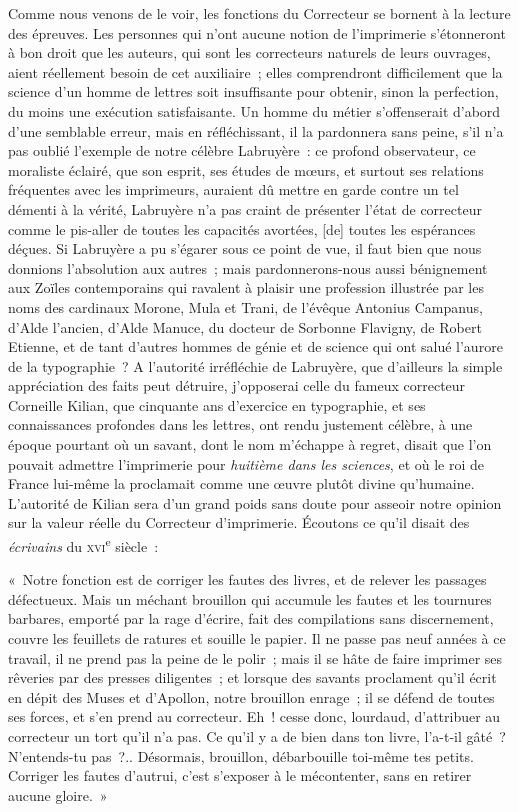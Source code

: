 \documentclass[french,twoside]{book} %
\newcommand\corr[1]{#1}
\begin{document}
Comme nous venons de le voir, les fonctions du Correcteur se bornent à la lecture  des épreuves. Les personnes qui n’ont aucune notion de l’imprimerie s’étonneront à bon droit que les auteurs, qui sont les correcteurs naturels de leurs ouvrages, aient réellement besoin de cet auxiliaire ; elles comprendront difficilement que la science d’un homme de lettres soit insuffisante pour obtenir, sinon la perfection, du moins une exécution satisfaisante. Un homme du métier s’offenserait d’abord d’une semblable erreur, mais en réfléchissant, il la pardonnera sans peine, s’il n’a pas oublié l’exemple de notre célèbre Labruyère : ce profond observateur, ce moraliste éclairé, que son esprit, ses études de mœurs, et surtout ses relations fréquentes avec les imprimeurs, auraient dû mettre en garde contre un tel démenti à la vérité, Labruyère n’a pas craint de présenter l’état de correcteur comme le pis-aller de toutes les capacités avortées, [{\corr de}] toutes les espérances déçues. Si Labruyère  a pu s’égarer sous ce point de vue, il faut bien que nous donnions l’absolution aux autres ; mais pardonnerons-nous aussi bénignement aux Zoïles contemporains qui ravalent à plaisir une profession illustrée par les noms des cardinaux Morone, Mula et Trani, de l’évêque Antonius Campanus, d’Alde l’ancien, d’Alde Manuce, du docteur de Sorbonne Flavigny, de Robert Etienne, et de tant d’autres hommes de génie et de science qui ont salué l’aurore de la typographie ? A l’autorité irréfléchie de Labruyère, que d’ailleurs la simple appréciation des faits peut détruire, j’opposerai celle du fameux correcteur Corneille Kilian, que cinquante ans d’exercice en typographie, et ses connaissances profondes dans les lettres, ont rendu justement célèbre, à une époque pourtant où un savant, dont le nom m’échappe à regret, disait que l’on pouvait admettre l’imprimerie pour \emph{huitième dans les sciences}, et où le  roi de France lui-même la proclamait comme une œuvre plutôt divine qu’humaine. L’autorité de Kilian sera d’un grand poids sans doute pour asseoir notre opinion sur la valeur réelle du Correcteur d’imprimerie. Écoutons ce qu’il disait des \emph{écrivains} du {\scshape xvi}\textsuperscript{e} siècle :\par
« Notre fonction est de corriger les fautes des livres, et de relever les passages défectueux. Mais un méchant brouillon qui accumule les fautes et les tournures barbares, emporté par la rage d’écrire, fait des compilations sans discernement, couvre les feuillets de ratures et souille le papier. Il ne passe pas neuf années à ce travail, il ne prend pas la peine de le polir ; mais il se hâte de faire imprimer ses rêveries par des presses diligentes ; et lorsque des savants proclament qu’il écrit en dépit des Muses et d’Apollon, notre brouillon enrage ; il se défend de toutes  ses forces, et s’en prend au correcteur. Eh ! cesse donc, lourdaud, d’attribuer au correcteur un tort qu’il n’a pas. Ce qu’il y a de bien dans ton livre, l’a-t-il gâté ? N’entends-tu pas ?.. Désormais, brouillon, débarbouille toi-même tes petits. Corriger les fautes d’autrui, c’est s’exposer à le mécontenter, sans en retirer aucune gloire. »\par
\end{document}
